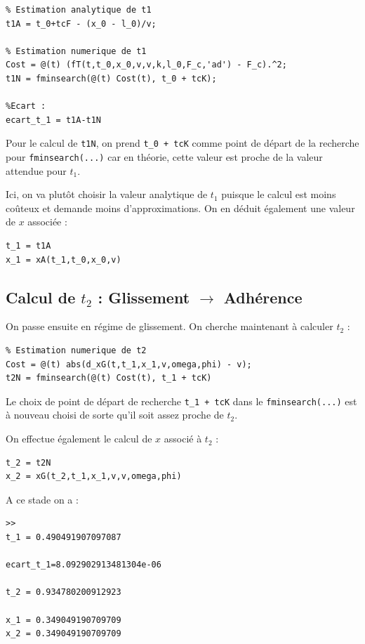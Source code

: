\documentclass{article}
\begin{document}
\begin{lstlisting}
% Estimation analytique de t1
t1A = t_0+tcF - (x_0 - l_0)/v;

% Estimation numerique de t1
Cost = @(t) (fT(t,t_0,x_0,v,v,k,l_0,F_c,'ad') - F_c).^2;
t1N = fminsearch(@(t) Cost(t), t_0 + tcK);

%Ecart :
ecart_t_1 = t1A-t1N
\end{lstlisting}

Pour le calcul de \verb|t1N|, on prend \verb|t_0 + tcK| comme point de départ de la recherche pour \verb|fminsearch(...)| car en théorie, cette valeur est proche de la valeur attendue pour $t_1$. 

Ici, on va plutôt choisir la valeur analytique de $t_1$ puisque le calcul est moins coûteux et demande moins d'approximations. On en déduit également une valeur de $x$ associée :
\begin{lstlisting}
t_1 = t1A
x_1 = xA(t_1,t_0,x_0,v)
\end{lstlisting}

\subsection{Calcul de $t_2$ : Glissement $\rightarrow$ Adhérence}
On passe ensuite en régime de glissement. On cherche maintenant à calculer $t_2$ : 

\begin{lstlisting}
% Estimation numerique de t2
Cost = @(t) abs(d_xG(t,t_1,x_1,v,omega,phi) - v);
t2N = fminsearch(@(t) Cost(t), t_1 + tcK)
\end{lstlisting}

Le choix de point de départ de recherche \verb|t_1 + tcK| dans le \verb|fminsearch(...)| est à nouveau choisi de sorte qu'il soit assez proche de $t_2$. 

On effectue également le calcul de $x$ associé à $t_2$ :

\begin{lstlisting}
t_2 = t2N
x_2 = xG(t_2,t_1,x_1,v,v,omega,phi)
\end{lstlisting}

A ce stade on a :

\begin{lstlisting}
>>
t_1 = 0.490491907097087

ecart_t_1=8.092902913481304e-06

t_2 = 0.934780200912923

x_1 = 0.349049190709709
x_2 = 0.349049190709709
\end{lstlisting}
\end{document}

